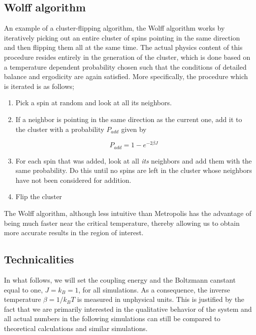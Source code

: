 \documentclass[11pt,a4paper]{article}
\begin{document}
\subsection{Wolff algorithm}
An example of a cluster-flipping algorithm, the Wolff algorithm works by iteratively picking out
 an entire cluster of spins pointing in the same direction and then flipping them all at the same time. The actual physics content of this 
 procedure resides entirely in the generation of the cluster, which is done based on a temperature dependent probability chosen such that the
 conditions of detailed balance and ergodicity are again satisfied.
 More specifically, the procedure which is iterated is as follows;
 \begin{enumerate}
 \item Pick a spin at random and look at all its neighbors.
 \item If a neighbor is pointing in the same direction as the current one, add it to the cluster with a probability $P_{add}$ given by

\begin{equation}\label{eq:A-ratio}
    P_{add} = 1 - e^{-2\beta J}
\end{equation}
 
 \item For each spin that was added, look at all \textit{its} neighbors and add them with the same probability. Do this until no spins are left
 in the cluster whose neighbors have not been considered for addition.
 \item Flip the cluster

 \end{enumerate}

The Wolff algorithm, although less intuitive than Metropolis has the advantage of being much faster near the critical temperature, thereby
 allowing us to obtain more accurate results in the region of interest.

\subsection{Technicalities}
In what follows, we will set the coupling energy and the Boltzmann canstant equal to one, 
 $J = k_B = 1$, for all simulations. As a consequence, the inverse temperature $\beta = 1/k_BT$ is measured in unphysical
 units. This is justified by the
 fact that  we are primarily interested in the qualitative behavior of the system and all actual numbers in the following
 simulations can still be compared to theoretical calculations and similar simulations. 
\end{document}
